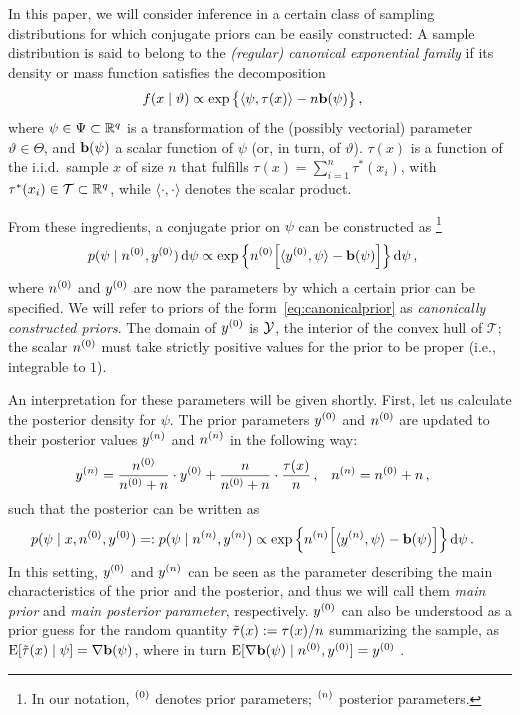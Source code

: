 In this paper, we will consider inference in a certain class of sampling distributions
for which conjugate priors can be easily constructed:
A sample distribution
is said to belong to the \emph{(regular) canonical exponential family} if its density or mass function satisfies the decomposition
\begin{align}
\label{eq:expofam-sampledens}
f(x \mid \vartheta) &\propto \exp\big\{\langle \psi, \tau(x) \rangle - n \mathbf{b}(\psi)\big\}\,,
\end{align}
where $\psi \in \Psi \subset \mathbb{R}^q$ is a transformation of the (possibly vectorial) parameter $\vartheta \in \Theta$,
and $\mathbf{b}(\psi)$ a scalar function of $\psi$ (or, in turn, of $\vartheta$).
$\tau(x)$ is a function of the i.i.d.\ sample $x$ of size $n$ that fulfills $\tau(x) = \sum_{i=1}^n \tau^*(x_i)$,
with $\tau^*(x_i) \in \mathcal{T} \subset \mathbb{R}^q$,
while $\langle\cdot, \cdot\rangle$ denotes the scalar product.

From these ingredients, a conjugate prior on $\psi$ can be constructed as%
\footnote{In our notation, ${}^{(0)}$ denotes prior parameters; ${}^{(n)}$ posterior parameters.}
\begin{align}
\label{eq:canonicalprior}
p(\psi \mid n^{(0)}, y^{(0)}) \,\mathrm{d}\psi
 &\propto \exp\Big\{ n^{(0)} \Big[ \langle y^{(0)}, \psi \rangle - \mathbf{b}(\psi) \Big] \Big\} \,\mathrm{d}\psi\,,
\end{align}
where $n^{(0)}$ and $y^{(0)}$ are now the parameters by which a certain prior can be specified.
We will refer to priors of the form~\eqref{eq:canonicalprior} as \emph{canonically constructed priors}.
The domain of $y^{(0)}$ is $\mathcal{Y}$, the interior of the convex hull of $\mathcal{T}$;
the scalar $n^{(0)}$ must take strictly positive values for the prior to be proper (i.e., integrable to $1$).

An interpretation for these parameters will be given shortly.
First, let us calculate the posterior density for $\psi$.
The prior parameters $y^{(0)}$ and $n^{(0)}$ are updated to their posterior values $y^{(n)}$ and $n^{(n)}$ in the following way:
\begin{align}\label{eq:canonicalupdate}
y^{(n)} &= \frac{n^{(0)}}{n^{(0)} + n} \cdot y^{(0)} + \frac{n}{n^{(0)} + n} \cdot \frac{\tau(x)}{n}\,, &
n^{(n)} &= n^{(0)} + n\,,
\end{align}
such that the posterior can be written as
\begin{align}\label{eq:canonicalposterior}
p(\psi \mid x, n^{(0)}, y^{(0)})
 =: p(\psi \mid n^{(n)}, y^{(n)})
 &\propto \exp\Big\{ n^{(n)} \Big[ \langle y^{(n)}, \psi \rangle - \mathbf{b}(\psi) \Big] \Big\} \,\mathrm{d}\psi\,.
\end{align}
In this setting, $y^{(0)}$ and $y^{(n)}$ can be seen as the parameter describing the main characteristics of the prior and the posterior,
and thus we will call them \emph{main prior} and \emph{main posterior parameter}, respectively.
$y^{(0)}$ can also be understood as a prior guess for the random quantity $\tilde{\tau}(x) := \tau(x)/n$ summarizing the sample,
as $\operatorname{E}[\tilde{\tau}(x) \mid \psi] = \nabla\mathbf{b}(\psi)$,
where in turn $\operatorname{E}[\nabla\mathbf{b}(\psi) \mid n^{(0)}, y^{(0)}] = y^{(0)}$ \cite[e.g.,][Prop.~5.7, p.~275]{2000:bernardosmith}.

